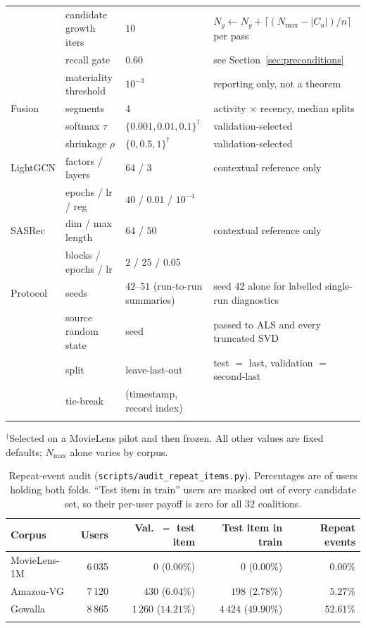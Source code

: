\documentclass[pdflatex,sn-basic,Numbered]{sn-jnl}
\theoremstyle{plain}
\theoremstyle{definition}
\begin{document}
\begin{table}[tbp]
\begin{tabularx}{\textwidth}{@{}ll>{\raggedright\arraybackslash}p{}X@{}}
      & candidate growth iters& $10$    & $N_g \gets N_g + \lceil (N_{\max} - |C_u|)/n \rceil$ per pass \\
      & recall gate           & $0.60$  & see Section~\ref{sec:preconditions} \\
      & materiality threshold & $10^{-3}$ & reporting only, not a theorem \\
\midrule
Fusion& segments             & $4$     & activity $\times$ recency, median splits \\
      & softmax $\tau$        & $\{0.001, 0.01, 0.1\}^{\dagger}$ & validation-selected \\
      & shrinkage $\rho$      & $\{0, 0.5, 1\}^{\dagger}$ & validation-selected \\
\midrule
LightGCN & factors / layers   & $64$ / $3$ & contextual reference only \\
      & epochs / lr / reg     & $40$ / $0.01$ / $10^{-4}$ & \\
SASRec& dim / max length      & $64$ / $50$ & contextual reference only \\
      & blocks / epochs / lr  & $2$ / $25$ / $0.05$ & \\
\midrule
Protocol & seeds              & $42$--$51$ (run-to-run summaries) & seed $42$ alone for labelled single-run diagnostics \\
      & source random state   & seed & passed to ALS and every truncated SVD \\
      & split                 & leave-last-out & test $=$ last, validation $=$ second-last \\
      & tie-break             & (timestamp, record index) & \\
\botrule
\end{tabularx}
\smallskip
\noindent\footnotesize $^{\dagger}$Selected on a MovieLens pilot and then
frozen. All other values are fixed defaults; $N_{\max}$ alone varies by corpus.
\end{table}

\begin{table}[tbp]
\caption{Repeat-event audit (\texttt{scripts/audit\_repeat\_items.py}).
Percentages are of users holding both folds. ``Test item in train'' users are
masked out of every candidate set, so their per-user payoff is zero for all
$32$ coalitions.}
\label{tab:repeats}
\small
\begin{tabular}{@{}lrrrr@{}}
\toprule
Corpus & Users & Val.\ $=$ test item & Test item in train & Repeat events \\
\midrule
MovieLens-1M & 6\,035 & $0$ ($0.00\%$)    & $0$ ($0.00\%$)      & $0.00\%$ \\
Amazon-VG    & 7\,120 & $430$ ($6.04\%$)  & $198$ ($2.78\%$)    & $5.27\%$ \\
Gowalla      & 8\,865 & $1\,260$ ($14.21\%$) & $4\,424$ ($49.90\%$) & $52.61\%$ \\
\botrule
\end{tabular}
\end{table}
\end{document}
